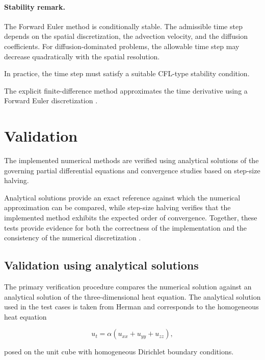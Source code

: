 \documentclass[11pt,a4paper,parskip=half-]{scrartcl}
\theoremstyle{definition}
\theoremstyle{plain}
\theoremstyle{remark}
\begin{document}
\paragraph{Stability remark.}

The Forward Euler method is conditionally stable.
The admissible time step depends on the spatial discretization,
the advection velocity, and the diffusion coefficients. For diffusion-dominated problems, the allowable time step may
decrease quadratically with the spatial resolution.

In practice, the time step must satisfy a suitable CFL-type
stability condition.

The explicit finite-difference method approximates the time derivative
using a Forward Euler discretization
\cite{LeVeque2007}.


\section{Validation}

The implemented numerical methods are verified using analytical
solutions of the governing partial differential equations and
convergence studies based on step-size halving.

Analytical solutions provide an exact reference against which the
numerical approximation can be compared, while step-size halving
verifies that the implemented method exhibits the expected order of
convergence. Together, these tests provide evidence for both the
correctness of the implementation and the consistency of the numerical
discretization \cite{LeVeque2007}.

\subsection{Validation using analytical solutions}

The primary verification procedure compares the numerical solution
against an analytical solution of the three-dimensional heat equation.
The analytical solution used in the test cases is taken from Herman
\cite{HermanPDE} and corresponds to the homogeneous heat equation

\[
u_t
=
\alpha
\left(
u_{xx}
+
u_{yy}
+
u_{zz}
\right),
\]

posed on the unit cube with homogeneous Dirichlet boundary conditions.
\end{document}
